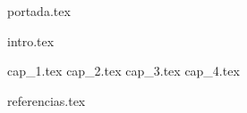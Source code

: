 \documentclass[12pt, a4paper]{article} %
\begin{document}

{portada.tex}

\newpage
{} 
\tableofcontents
\newpage

{intro.tex}
\newpage

{cap_1.tex}
\nopagebreak
{cap_2.tex}
\newpage
{cap_3.tex}
\newpage
{cap_4.tex}
\newpage

{referencias.tex}
\end{document}
